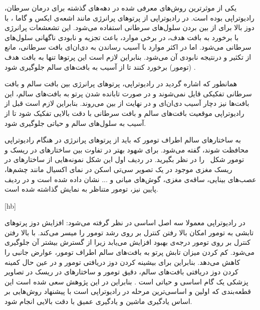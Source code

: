 

یکی از موثرترین روش‌های معرفی شده در دهه‌های گذشته برای درمان سرطان، رادیوتراپی	 بوده است. در رادیوتراپی از پرتوهای پرانرژی مانند اشعه‌ی ایکس	 و گاما	، با دوز	 بالا برای از بین بردن سلول‌های سرطانی استفاده می‌شود. این تشعشعات پرانرژی با برخورد به بافت هدف، در برخی موارد، باعث تجزیه و نابودی ناگهانی سلول‌های سرطانی می‌شود. اما در اکثر موارد با آسیب رساندن به دی‌ان‌ای بافت سرطانی، مانع از تکثیر و درنتیجه نابودی آن می‌شود. بنابراین لازم است این پرتوها تنها به بافت هدف (تومور) برخورد کنند تا از آسیب به بافت‌های سالم جلوگیری شود . 





همانطور که اشاره گردید در رادیوتراپی، پرتوهای پرانرژی بین بافت سالم و بافت سرطانی تفکیکی قایل نمی‌شوند و در صورت تابانده شدن پرتو به بافت‌های سالم، این بافت‌ها نیز دچار آسیب دی‌ان‌ای و در نهایت از بین می‌روند. بنابراین لازم است قبل از رادیوتراپی موقعیت بافت‌های سالم و بافت سرطانی با دقت بالایی تفکیک شود تا از آسیب به سلول‌های سالم و حیاتی جلوگیری شود.

به ساختارهای سالم اطراف تومور که باید از پرتوهای پرانرژی در هنگام رادیوتراپی محافظت شوند، گفته می‌شود. برای شهود بهتر در تفاوت بین ساختارهای در ریسک و تومور شکل‌~ را در نظر بگیرید. در ردیف اول این شکل نمونه‌هایی از ساختارهای در ریسک مغزی موجود در یک تصویر سی‌تی اسکن در نمای اکسیال مانند چشم‌ها، عصب‌های بینایی، ساقه‌ی مغزی، گوش‌های میانی و ... نشان داده شده است و در ردیف پایین نیز، تومور متناظر به نمایش گذاشته شده است.

[hb]

در رادیوتراپی معمولا سه اصل اساسی در نظر گرفته می‌شود:
 افزایش دوز پرتوهای تابشی به تومور امکان بالا رفتن کنترل بر روی رشد تومور را میسر می‌کند.
 با بالا رفتن کنترل بر روی تومور درجه‌ی بهبود افزایش می‌یابد زیرا از گسترش بیشتر آن جلوگیری می‌شود.
 کم کردن میزان تابش پرتو به بافت‌های سالم اطراف تومور، عوارض جانبی را کاهش می‌دهد.
بنابراین برای بیشینه کردن دوز دریافتی تومور و در عین حال کمینه کردن دوز دریافتی بافت‌های سالم،  دقیق تومور و ساختارهای در ریسک در تصاویر پزشکی یک گام اساسی و حیاتی است . بنابراین در این پژوهش سعی شده است این قطعه‌بندی که اولین و اساسی‌ترین مرحله در رادیوتراپی است با پیشنهاد روش‌هایی بر اساس یادگیری ماشین و یادگیری عمیق با دقت بالایی انجام شود.
	

